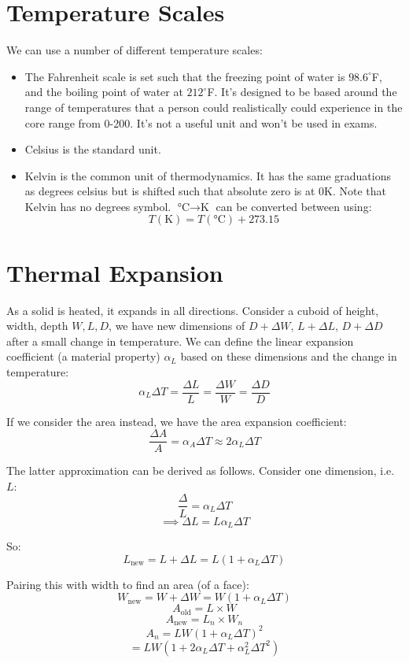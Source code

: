 \section{Temperature Scales}
We can use a number of different temperature scales:
\begin{itemize}
    \item The Fahrenheit scale is set such that the freezing point of water is $98.6^\circ$F, and the boiling point of water at $212^\circ$F. It's designed to be based around the range of temperatures that a person could realistically could experience in the core range from 0-200. It's not a useful unit and won't be used in exams.
    \item Celsius is the standard unit.
    \item Kelvin is the common unit of thermodynamics. It has the same graduations as degrees celsius but is shifted such that absolute zero is at $0$K. Note that Kelvin has no degrees symbol. $\si{\degreeCelsius} \to \si{\kelvin}$ can be converted between using:
    \[T (\si{\kelvin}) = T (\si{\degreeCelsius}) + 273.15\]
\end{itemize}

\section{Thermal Expansion}
As a solid is heated, it expands in all directions. Consider a cuboid of height, width, depth $W, L, D$, we have new dimensions of $D + \Delta W, \, L + \Delta L, \, D + \Delta D$ after a small change in temperature. We can define the linear expansion coefficient (a material property) $\alpha_L$ based on these dimensions and the change in temperature:
\[
    \alpha_L \Delta T = \frac{\Delta L}{L} = \frac{\Delta W}{W} = \frac{\Delta D}{D}
\]

If we consider the area instead, we have the area expansion coefficient:
\[
    \frac{\Delta A}{A} = \alpha_A \Delta T \approx 2 \alpha_L \Delta T
\]

The latter approximation can be derived as follows. Consider one dimension, i.e. $L$:
\[
    \frac{\Delta}{L} = \alpha_L \Delta T
\]
\[
    \implies \Delta L = L \alpha_L \Delta T
\]

So:
\[
    L_\text{new} = L + \Delta L = L \left(1 + \alpha_L \Delta T\right)
\]

Pairing this with width to find an area (of a face):
\[
    W_\text{new} = W + \Delta W = W \left(1 + \alpha_L \Delta T\right)
\]
\[
    A_\text{old} = L \times W
\]
\[
    A_\text{new} = L_n \times W_n
\]
\[
    A_n = LW \left(1 + \alpha_L \Delta T\right)^2
\]
\[
    = LW \left(1 + 2 \alpha_L \Delta T + \alpha_L^2 \Delta T^2\right)
\]

